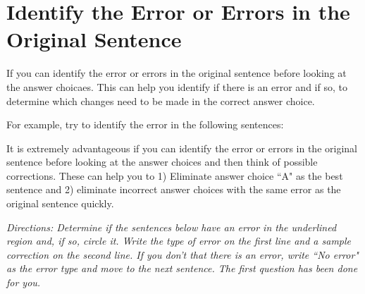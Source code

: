\section{Identify the Error or Errors in the Original Sentence}
If you can identify the error or errors in the original sentence before looking at the answer choicaes. This can help you identify if there is an error and if so, to determine which changes need to be made in the correct answer choice. 

For example, try to identify the error in the following sentences:

It is extremely advantageous if you can identify the error or errors in the original sentence before looking at the answer choices and then think of possible corrections. These can help you to 1) Eliminate answer choice ``A" as the best sentence and 2) eliminate incorrect answer choices with the same error as the original sentence quickly. 

\bigskip
\textit{Directions: Determine if the sentences below have an error in the underlined region and, if so, circle it. Write the type of error on the first line and a sample correction on the second line. If you don't that there is an error, write ``No error" as the error type and move to the next sentence. The first question has been done for you.}

